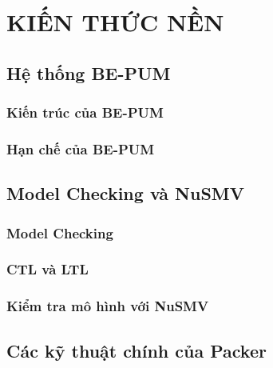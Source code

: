 
\newpage
\chapter{KIẾN THỨC NỀN}

\section{Hệ thống BE-PUM}

\subsection{Kiến trúc của BE-PUM}

\subsection{Hạn chế của BE-PUM}

\section{Model Checking và NuSMV}

\subsection{Model Checking}

\subsection{CTL và LTL}

\subsection{Kiểm tra mô hình với NuSMV}

\section{Các kỹ thuật chính của Packer}

